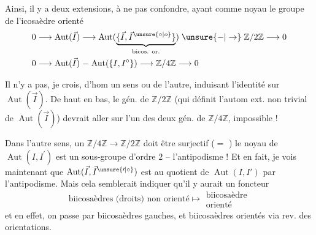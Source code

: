 Ainsi, il y a deux extensions, à ne pas
confondre, ayant comme noyau le
groupe de l'icosaèdre orienté
\[
\begin{aligned}
0\longrightarrow\operatorname{Aut}(\vec I)&\longrightarrow
 \operatorname{Aut}(\underbrace{\{\vec I,\vec I^{\unsure{\circ|o}}\}}_{\text{bicos. or.}})
 \mathrel{\unsure{-|\to}}\mathbb Z/2\mathbb Z\longrightarrow0\\
0\longrightarrow\operatorname{Aut}(\vec I)&\mathrel{-}
 \operatorname{Aut}(\{I,I^\circ\})\longrightarrow\mathbb Z/4\mathbb Z\longrightarrow0
\end{aligned}
\]

Il n'y a pas, je crois, d'hom  un sens
ou de l'autre, induisant l'identité
sur $\operatorname{Aut}(\vec I)$. De haut en bas, le gén. de
$\mathbb Z/2\mathbb Z$ (qui définit l'autom ext. non trivial
de $\operatorname{Aut}(\vec I)$) devrait aller sur l'un des
deux gén. de $\mathbb Z/4\mathbb Z$, impossible !

Dans l'autre sens, un  $\mathbb Z/4\mathbb Z\longrightarrow\mathbb Z/2\mathbb Z$
doit être surjectif ($=$ ) le noyau
 de $\operatorname{Aut}(I,I^{\prime})$ est un sous-groupe
d'ordre $2$ -- l'antipodisme ! Et en fait,
je vois maintenant que $\operatorname{Aut}(\vec I,\vec I^{\unsure{\prime|\circ}})$ est 
 au quotient de  $\operatorname{Aut}(I,I')$
par l'antipodisme. Mais cela semblerait
indiquer qu'il y aurait un foncteur
\[
\text{biicosaèdres (droits) non orienté}\longmapsto\substack{\text{biicosaèdre}\\\text{orienté}}
\]
et en effet, on passe par biicosaèdres
gauches, et biicosaèdres orientés via rev.
des orientations.
